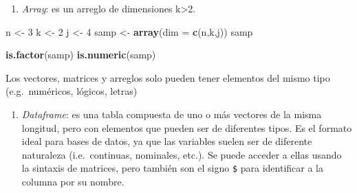\documentclass[]{article}
\newenvironment{Shaded}{\begin{snugshade}}{\end{snugshade}}
\newcommand{\CommentTok}[1]{\textcolor[rgb]{0.56,0.35,0.01}{\textit{#1}}}
\newcommand{\DataTypeTok}[1]{\textcolor[rgb]{0.13,0.29,0.53}{#1}}
\newcommand{\DecValTok}[1]{\textcolor[rgb]{0.00,0.00,0.81}{#1}}
\newcommand{\KeywordTok}[1]{\textcolor[rgb]{0.13,0.29,0.53}{\textbf{#1}}}
\newcommand{\NormalTok}[1]{#1}
\newcommand{\OperatorTok}[1]{\textcolor[rgb]{0.81,0.36,0.00}{\textbf{#1}}}
\newcommand{\StringTok}[1]{\textcolor[rgb]{0.31,0.60,0.02}{#1}}
\providecommand{\tightlist}{%
  \setlength{\itemsep}{0pt}\setlength{\parskip}{0pt}}
\begin{document}
\begin{enumerate}
\def\labelenumi{\Alph{enumi})}
\setcounter{enumi}{2}
\tightlist
\item
  \emph{Array}: es un arreglo de dimensiones k\textgreater2.
\end{enumerate}

\begin{Shaded}
\begin{Highlighting}[]
\NormalTok{n <-}\StringTok{ }\DecValTok{3}
\NormalTok{k <-}\StringTok{ }\DecValTok{2}
\NormalTok{j <-}\StringTok{ }\DecValTok{4}
\NormalTok{samp <-}\StringTok{ }\KeywordTok{array}\NormalTok{(}\DataTypeTok{dim =} \KeywordTok{c}\NormalTok{(n,k,j))}
\NormalTok{samp}

\KeywordTok{is.factor}\NormalTok{(samp)}
\KeywordTok{is.numeric}\NormalTok{(samp)}
\end{Highlighting}
\end{Shaded}

Los vectores, matrices y arreglos solo pueden tener elementos del mismo
tipo (e.g.~numéricos, lógicos, letras)

\begin{enumerate}
\def\labelenumi{\Alph{enumi})}
\setcounter{enumi}{3}
\tightlist
\item
  \emph{Dataframe}: es una tabla compuesta de uno o más vectores de la
  misma longitud, pero con elementos que pueden ser de diferentes tipos.
  Es el formato ideal para bases de datos, ya que las variables suelen
  ser de diferente naturaleza (i.e.~continuas, nominales, etc.). Se
  puede acceder a ellas usando la sintaxis de matrices, pero también son
  el signo \texttt{\$} para identificar a la columna por su nombre.
\end{enumerate}

\begin{Shaded}
\end{Shaded}
\end{document}

